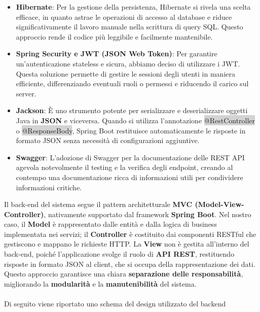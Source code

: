 \begin{itemize}
	\item \textbf{Hibernate}: Per la gestione della persistenza, Hibernate si rivela una scelta efficace, in quanto astrae le operazioni di accesso al database e riduce significativamente il lavoro manuale nella scrittura di query SQL. Questo approccio rende il codice più leggibile e facilmente mantenibile.
	
	\item \textbf{Spring Security e JWT (JSON Web Token)}: Per garantire un'autenticazione stateless e sicura, abbiamo deciso di utilizzare i JWT. Questa soluzione permette di gestire le sessioni degli utenti in maniera efficiente, differenziando eventuali ruoli o permessi e riducendo il carico sul server.
	
	\item \textbf{Jackson}: È uno strumento potente per serializzare e deserializzare oggetti Java in \textbf{JSON} e viceversa.
	Quando si utilizza l’annotazione \colorbox{lightgray}{@RestController} o \colorbox{lightgray}{@ResponseBody}, Spring Boot restituisce automaticamente le risposte in formato JSON senza necessità di configurazioni aggiuntive.
	
	\item \textbf{Swagger}: L’adozione di Swagger per la documentazione delle REST API agevola notevolmente il testing e la verifica degli endpoint, creando al contempo una documentazione ricca di informazioni utili per condividere informazioni critiche.
\end{itemize}

Il back-end del sistema segue il pattern architetturale \textbf{MVC (Model-View-Controller)}, nativamente supportato dal framework \textbf{Spring Boot}.
Nel nostro caso, il \textbf{Model} è rappresentato dalle entità e dalla logica di business implementata nei servizi; il \textbf{Controller} è costituito dai componenti RESTful che gestiscono e mappano le richieste HTTP.
La \textbf{View} non è gestita all’interno del back-end, poiché l’applicazione svolge il ruolo di \textbf{API REST}, restituendo risposte in formato JSON al client, che si occupa della rappresentazione dei dati.
Questo approccio garantisce una chiara \textbf{separazione delle responsabilità}, migliorando la \textbf{modularità} e la \textbf{manutenibilità} del sistema.
\\ \\
Di seguito viene riportato uno schema del design utilizzato del backend

